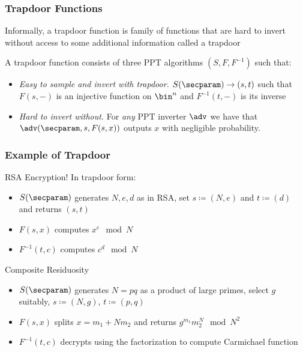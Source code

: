 \documentclass{beamer}
\begin{document}
\begin{frame}
    \frametitle{Trapdoor Functions}
    Informally, a trapdoor function is family of functions that are
    hard to invert without access to some additional information called a trapdoor
    \begin{definition}
        A trapdoor function consists of three PPT algorithms $(S, F, F^{-1})$
        such that:
        \begin{itemize}
            \item \textit{Easy to sample and invert with trapdoor.} $S(\secparam) \rightarrow (s, t)$
                  such that $F(s, {-})$ is an injective function on $\bin^n$ and $F^{-1}(t, {-})$ is its inverse
            \item \textit{Hard to invert without.} For \textit{any} PPT inverter $\adv$ we have that $\adv(\secparam, s, F(s, x))$
                  outputs $x$ with negligible probability.
        \end{itemize}
    \end{definition}
\end{frame}

\begin{frame}
    \frametitle{Example of Trapdoor}
    RSA Encryption! In trapdoor form:
    \begin{itemize}
        \item $S(\secparam)$ generates $N, e, d$ as in RSA,
              set $s \coloneqq (N, e)$ and $t \coloneqq (d)$ and returns $(s, t)$
        \item $F(s, x)$ computes $x^e \mod N$
        \item $F^{-1}(t, c)$ computes $c^d \mod N$
    \end{itemize}
    Composite Residuosity
    \begin{itemize}
        \item $S(\secparam)$ generates $N = pq$ as a product of large primes,
              select $g$ suitably, $s \coloneqq (N, g)$, $t \coloneqq (p, q)$
        \item $F(s, x)$ splits $x = m_1 + N m_2$ and returns $g^{m_1} m_2^N \mod N^2$
        \item $F^{-1}(t, c)$ decrypts using the factorization to compute Carmichael function
    \end{itemize}
\end{frame}
\end{document}
